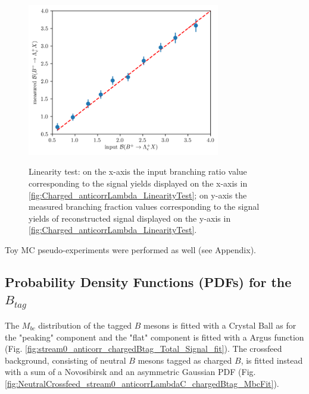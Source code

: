 \begin{figure}[H]  
{\includegraphics[width=0.75\textwidth]{06-chargedAnticorrBtoLambda/figs/Charged_anticorrLambda_BR_LinearityTest.png}}
\caption{Linearity test: on the x-axis the input branching ratio value corresponding to the signal yields displayed on the x-axis in \cref{fig:Charged_anticorrLambda_LinearityTest}; 
on y-axis the measured branching fraction values corresponding to the signal yields of reconstructed signal displayed on the y-axis in \cref{fig:Charged_anticorrLambda_LinearityTest}.}
\label{fig:Charged_anticorrLambda_BR_LinearityTest}
\end{figure}

\noindent  Toy MC pseudo-experiments were performed as well (see Appendix).%
 
\newpage

\subsection{Probability Density Functions (PDFs) for the $B_{tag}$}
The $M_{bc}$ distribution of the tagged  $B$ mesons is fitted with a Crystal Ball as for the "peaking" component and the "flat" component is fitted with a Argus function (Fig. \ref{fig:stream0_anticorr_chargedBtag_Total_Signal_fit}).
The crossfeed background, consisting of neutral $B$ mesons tagged as charged $B$, is fitted instead with a sum of a Novosibirsk and an asymmetric Gaussian PDF (Fig. \ref{fig:NeutralCrossfeed_stream0_anticorrLambdaC_chargedBtag_MbcFit}).


